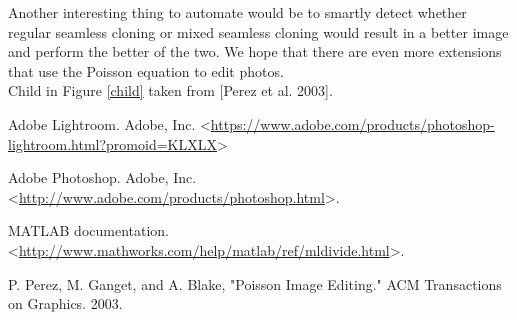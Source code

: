 \documentclass[12pt]{article}
\begin{document}
Another interesting thing to automate would be to smartly detect whether regular seamless cloning or mixed seamless cloning would result in a better image and perform the better of the two. We hope that there are even more extensions that use the Poisson equation to edit photos.\\

Child in Figure \ref{child} taken from [Perez et al. 2003].
\begin{thebibliography}{99}

Adobe Lightroom. Adobe, Inc. \textless\url{https://www.adobe.com/products/photoshop-lightroom.html?promoid=KLXLX}\textgreater

Adobe Photoshop. Adobe, Inc. \textless\url{http://www.adobe.com/products/photoshop.html}\textgreater.

MATLAB documentation. \textless\url{http://www.mathworks.com/help/matlab/ref/mldivide.html}\textgreater.

P. Perez, M. Ganget, and A. Blake, "Poisson Image Editing." ACM Transactions on Graphics. 2003.
\end{thebibliography}
\end{document}

